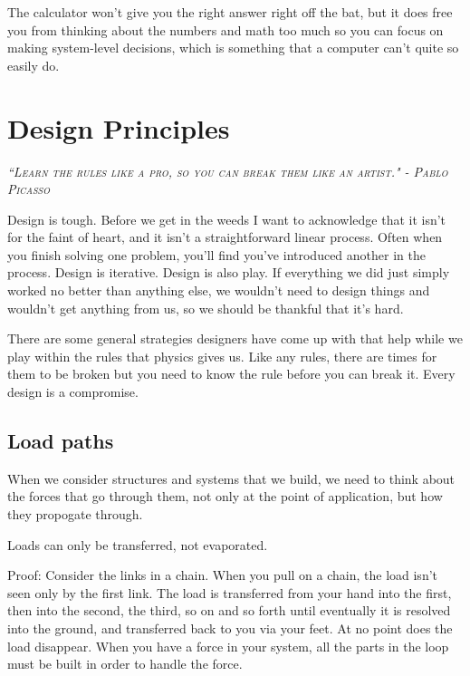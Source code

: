 	The calculator won't give you the right answer right off the bat, but it does free you from thinking about the numbers and math too much so you can focus on making system-level decisions, which is something that a computer can't quite so easily do.
	
\chapter{Design Principles}

 {\slshape \scshape ``Learn the rules like a pro, so you can break them like an artist." - Pablo Picasso}
 
Design is tough. Before we get in the weeds I want to acknowledge that it isn't for the faint of heart, and it isn't a straightforward linear process. Often when you finish solving one problem, you'll find you've introduced another in the process. Design is iterative. Design is also play. If everything we did just simply worked no better than anything else, we wouldn't need to design things and wouldn't get anything from us, so we should be thankful that it's hard.

There are some general strategies designers have come up with that help while we play within the rules that physics gives us. Like any rules, there are times for them to be broken but you need to know the rule before you can break it. Every design is a compromise.

\section{Load paths}

When we consider structures and systems that we build, we need to think about the forces that go through them, not only at the point of application, but how they propogate through.

\begin{theorem} \label{theorem:load_paths}
	Loads can only be transferred, not evaporated.
\end{theorem}

Proof: Consider the links in a chain. When you pull on a chain, the load isn't seen only by the first link. The load is transferred from your hand into the first, then into the second, the third, so on and so forth until eventually it is resolved into the ground, and transferred back to you via your feet. At no point does the load disappear. When you have a force in your system, all the parts in the loop must be built in order to handle the force.

